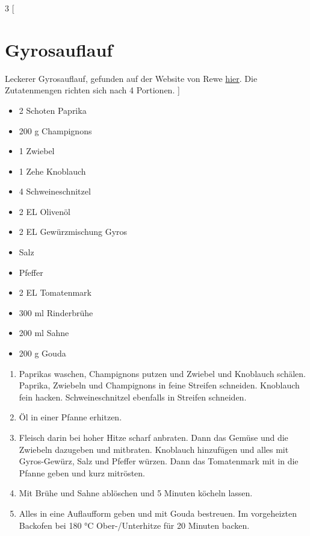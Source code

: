 \documentclass[11pt]{report}
\begin{document}
\pagecolor{lightgray}
\begin{multicols}{3}
[
\section{Gyrosauflauf}
Leckerer Gyrosauflauf, gefunden auf der Website von Rewe \href{https://www.rewe.de/rezepte/low-carb-gyros-auflauf/}{hier}.
Die Zutatenmengen richten sich nach 4 Portionen.
]
    \raggedcolumns
    \begin{itemize}[label={}, labelsep=0pt, leftmargin=0pt]
        \item 2 Schoten Paprika
        \item 200 g Champignons
        \item 1 Zwiebel
        \item 1 Zehe Knoblauch
        \item 4 Schweineschnitzel
        \item 2 EL Olivenöl
        \item 2 EL Gewürzmischung Gyros
        \item Salz
        \item Pfeffer
        \item 2 EL Tomatenmark
        \item 300 ml Rinderbrühe
        \item 200 ml Sahne
        \item 200 g Gouda
    \end{itemize}
    \columnbreak

    \begin{enumerate}
        \item Paprikas waschen, Champignons putzen und Zwiebel und Knoblauch schälen.
        Paprika, Zwiebeln und Champignons in feine Streifen schneiden.
        Knoblauch fein hacken.
        Schweineschnitzel ebenfalls in Streifen schneiden.
        \item Öl in einer Pfanne erhitzen.
        \item Fleisch darin bei hoher Hitze scharf anbraten.
        Dann das Gemüse und die Zwiebeln dazugeben und mitbraten.
        Knoblauch hinzufügen und alles mit Gyros-Gewürz, Salz und Pfeffer würzen.
        Dann das Tomatenmark mit in die Pfanne geben und kurz mitrösten.
        \item  Mit Brühe und Sahne ablöschen und 5 Minuten köcheln lassen.
        \item Alles in eine Auflaufform geben und mit Gouda bestreuen.
        Im vorgeheizten Backofen bei 180 °C Ober-/Unterhitze für 20 Minuten backen.
    \end{enumerate}
\end{multicols}
\clearpage\null\vfill
\end{document}
